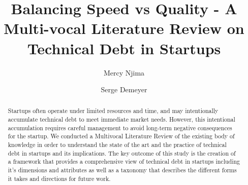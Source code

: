 \documentclass[manuscript]{acmart}
\begin{document}
%
\title{Balancing Speed vs Quality - A Multi-vocal Literature Review on Technical Debt in Startups}
%
\author{Mercy Njima}

\author{Serge Demeyer}

%

%
\begin{abstract}
 Startups often operate under limited resources and time, and may intentionally accumulate technical debt to meet immediate market needs.
 However, this intentional accumulation requires careful management to avoid long-term negative consequences for the startup.
 We conducted a Multivocal Literature Review of the existing body of knowledge in order to understand the state of the art and the practice
 of technical debt in startups and its implications. The key outcome of this study is the creation of a framework that provides a
 comprehensive view of technical debt in startups including it's dimensions and attributes as well as a taxonomy that describes the
 different forms it takes and directions for future work.
\end{abstract}
%
%
\end{document}
